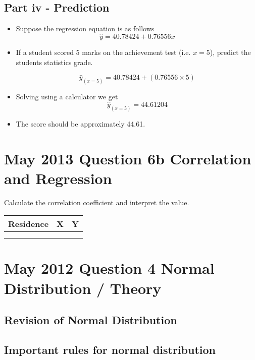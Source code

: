 \documentclass[a4paper,12pt]{article}
\begin{document}

\subsection*{Part iv - Prediction}
\begin{itemize}
	\item Suppose the regression equation is as follows
	\[ \hat{y} = 40.78424 + 0.76556 x \]
	\item If a student scored 5 marks on the achievement test (i.e. $x=5$), predict the students statistics grade.
	
	\[ \hat{y}_{(x=5)} = 40.78424 + (0.76556 \times 5) \]
	
	\item Solving using a calculator we get
	\[ \hat{y}_{(x=5)} = 44.61204 \]
	
	\item The score should be approximately 44.61.
\end{itemize}

\newpage

\section*{May 2013 Question 6b Correlation and Regression }
Calculate the correlation coefficient and interpret the value.
\begin{tabular}{|c|c|c|}
	\hline Residence	& X	  & Y \\ 
	\hline  &  &  \\ 
	\hline  &  &  \\ 
	\hline 
\end{tabular} 
\newpage


\section*{May 2012 Question 4 Normal Distribution / Theory}

\subsection*{Revision of Normal Distribution}
\subsection{Important rules for normal distribution}
\end{document}
